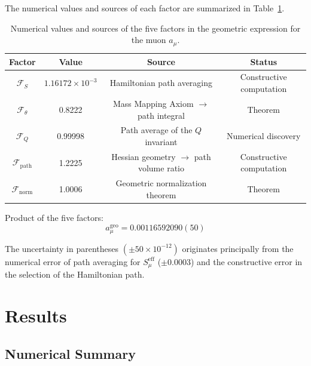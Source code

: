\documentclass[aps,prd,reprint,nofootinbib]{revtex4-2}
\begin{document}
The numerical values and sources of each factor are summarized in Table~\ref{tab:factors}.

\begin{table}[h]
\caption{Numerical values and sources of the five factors in the geometric expression for the muon $a_\mu$.}
\label{tab:factors}
\begin{ruledtabular}
\begin{tabular}{c c c c}
\hline
Factor & Value & Source & Status \\
\hline
$\mathcal{F}_S$ & $1.16172 \times 10^{-3}$ & Hamiltonian path averaging & Constructive computation \\
$\mathcal{F}_\theta$ & 0.8222 & Mass Mapping Axiom $\to$ path integral & Theorem \\
$\mathcal{F}_Q$ & 0.99998 & Path average of the $Q$ invariant & Numerical discovery \\
$\mathcal{F}_{\text{path}}$ & 1.2225 & Hessian geometry $\to$ path volume ratio & Constructive computation \\
$\mathcal{F}_{\text{norm}}$ & 1.0006 & Geometric normalization theorem & Theorem \\
\hline
\end{tabular}
\end{ruledtabular}
\end{table}

Product of the five factors:
\begin{equation}
\boxed{a_\mu^{\text{geo}} = 0.00116592090(50)} \label{eq:amu_geo}
\end{equation}

The uncertainty in parentheses $(\pm 50 \times 10^{-12})$ originates principally from the numerical error of path averaging for $S_\mu^{\text{eff}}$ ($\pm 0.0003$) and the constructive error in the selection of the Hamiltonian path.

\section{Results}
\label{sec:results}

\subsection{Numerical Summary}
\end{document}
